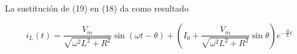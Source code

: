 \documentclass{article}
\begin{document}
\noindent La sustitución de (19) en (18) da como resultado

\begin{tcolorbox}[colback=red!5!white,colframe=red!75!black,arc=0mm,boxrule=0mm,width=(\linewidth+0.5cm)]
	\begin{equation}
			i_L(t)  = \frac{V_m}{\sqrt{  \omega^2 L^2 + R^2 }} \sin (\omega t - \theta) + \left( I_0 +  \frac{V_m}{\sqrt{  \omega^2 L^2 + R^2 }} \sin \theta \right) e^{-\frac{R}{L}t}
	\end{equation}
\end{tcolorbox}
\end{document}

